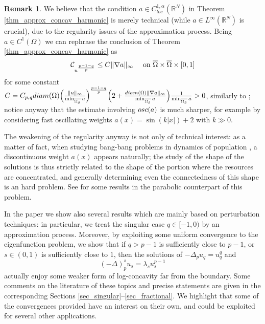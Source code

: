 \documentclass[11pt, reqno]{amsart}
\theoremstyle{definition}
\newtheorem{remark}[lemma]{Remark}
\numberwithin{equation}{section}
\newcommand{\R}{\mathbb{R}}
\newcommand{\mc}[1]{\mathcal{#1}}
\newcommand{\diam}{{\rm diam}}
\newcommand{\osc}{{\rm osc}}
\def\norm#1{\|#1\|}
\begin{document}
\begin{remark}
We believe that the condition $a \in C^{1,\alpha}_{loc}(\R^N)$ in Theorem \ref{thm_approx_concav_harmonic} is merely technical (while $a \in L^{\infty}(\R^N)$ is crucial), due to the regularity issues of the approximation process.
Being $a \in C^1(\Omega)$ we can rephrase the conclusion of Theorem \ref{thm_approx_concav_harmonic} as
$$\mc{C}_{u^{ \frac{p-1 - q}{p}}} \leq C \norm{\nabla a}_{\infty} \quad \hbox{ on $ \overline{\Omega} \times \overline{\Omega} \times [0,1]$}$$
for some constant $C= C_{p,q}\diam(\Omega) \Big( \frac{ \norm{u}_{\infty}}{\min_{\overline{\Omega_{\delta}}} u}\Big)^{\frac{p-1-q}{p}} \Big( 2 + \frac{\diam(\Omega) \norm{\nabla a}_{\infty} }{\min_{\overline{\Omega_{\delta}}} a}\Big) \frac{1}{ \min_{\overline{\Omega_{\delta}}} a} >0$,
similarly to \cite{BuSq20}; notice anyway that the estimate involving $\osc(a)$ is much sharper, for example by considering fast oscillating weights $a(x)=\sin(k|x|)+2$ with $k\gg 0$.
 
The weakening of the regularity anyway is not only of technical interest: as a matter of fact, when studying bang-bang problems in dynamics of population \cite{FeVe22}, a discontinuous weight $a(x)$ appears naturally; the study of the shape of the solutions is thus strictly related to the shape of the portion where the resources are concentrated, and generally determining even the connectedness of this shape is an hard problem. See \cite{GMrS25} for some results in the parabolic counterpart of this problem.
 \end{remark}
 
In the paper we show also several results which are mainly based on perturbation techniques: in particular, we treat the singular case $q \in [-1,0)$ by an approximation process.
Moreover, by exploiting some uniform convergence to the eigenfunction problem, we show that if $q>p-1$ is sufficiently close to $p-1$, or $s\in (0,1)$ is sufficiently close to $1$, then the solutions of $-\Delta_p u_q = u_q^q$ and 
$$(-\Delta)^s_p u_s =\lambda_s u_s^{p-1}$$
actually enjoy some weaker form of log-concavity far from the boundary. 
Some comments on the literature of these topics and precise statements are given in the corresponding Sections \ref{sec_singular}--\ref{sec_fractional}. 
We highlight that some of the convergences provided have an interest on their own, and could be exploited for several other applications.

\medskip
\end{document}
